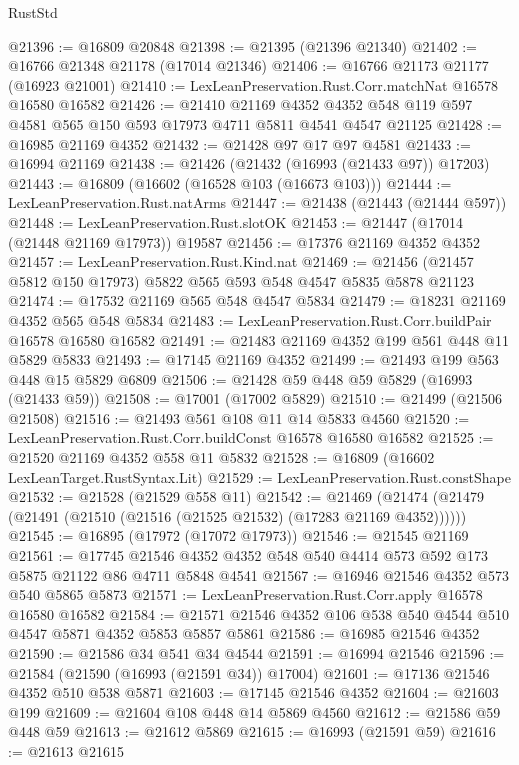 \begin{lexlean}{RustStd}
\begin{coremodule}
@21396 := @16809 @20848
@21398 := @21395 (@21396 @21340)
@21402 := @16766 @21348 @21178 (@17014 @21346)
@21406 := @16766 @21173 @21177 (@16923 @21001)
@21410 := LexLeanPreservation.Rust.Corr.matchNat @16578 @16580 @16582
@21426 := @21410
    @21169
    @4352
    @4352
    @548
    @119
    @597
    @4581
    @565
    @150
    @593
    @17973
    @4711
    @5811
    @4541
    @4547
    @21125
@21428 := @16985 @21169 @4352
@21432 := @21428 @97 @17 @97 @4581
@21433 := @16994 @21169
@21438 := @21426 (@21432 (@16993 (@21433 @97)) @17203)
@21443 := @16809 (@16602 (@16528 @103 (@16673 @103)))
@21444 := LexLeanPreservation.Rust.natArms
@21447 := @21438 (@21443 (@21444 @597))
@21448 := LexLeanPreservation.Rust.slotOK
@21453 := @21447 (@17014 (@21448 @21169 @17973)) @19587
@21456 := @17376 @21169 @4352 @4352
@21457 := LexLeanPreservation.Rust.Kind.nat
@21469 := @21456 (@21457 @5812 @150 @17973) @5822 @565 @593 @548 @4547 @5835 @5878 @21123
@21474 := @17532 @21169 @565 @548 @4547 @5834
@21479 := @18231 @21169 @4352 @565 @548 @5834
@21483 := LexLeanPreservation.Rust.Corr.buildPair @16578 @16580 @16582
@21491 := @21483 @21169 @4352 @199 @561 @448 @11 @5829 @5833
@21493 := @17145 @21169 @4352
@21499 := @21493 @199 @563 @448 @15 @5829 @6809
@21506 := @21428 @59 @448 @59 @5829 (@16993 (@21433 @59))
@21508 := @17001 (@17002 @5829)
@21510 := @21499 (@21506 @21508)
@21516 := @21493 @561 @108 @11 @14 @5833 @4560
@21520 := LexLeanPreservation.Rust.Corr.buildConst @16578 @16580 @16582
@21525 := @21520 @21169 @4352 @558 @11 @5832
@21528 := @16809 (@16602 LexLeanTarget.RustSyntax.Lit)
@21529 := LexLeanPreservation.Rust.constShape
@21532 := @21528 (@21529 @558 @11)
@21542 := @21469 (@21474 (@21479 (@21491 (@21510 (@21516 (@21525 @21532) (@17283 @21169 @4352))))))
@21545 := @16895 (@17972 (@17072 @17973))
@21546 := @21545 @21169
@21561 := @17745
    @21546
    @4352
    @4352
    @548
    @540
    @4414
    @573
    @592
    @173
    @5875
    @21122
    @86
    @4711
    @5848
    @4541
@21567 := @16946 @21546 @4352 @573 @540 @5865 @5873
@21571 := LexLeanPreservation.Rust.Corr.apply @16578 @16580 @16582
@21584 := @21571 @21546 @4352 @106 @538 @540 @4544 @510 @4547 @5871 @4352 @5853 @5857 @5861
@21586 := @16985 @21546 @4352
@21590 := @21586 @34 @541 @34 @4544
@21591 := @16994 @21546
@21596 := @21584 (@21590 (@16993 (@21591 @34)) @17004)
@21601 := @17136 @21546 @4352 @510 @538 @5871
@21603 := @17145 @21546 @4352
@21604 := @21603 @199
@21609 := @21604 @108 @448 @14 @5869 @4560
@21612 := @21586 @59 @448 @59
@21613 := @21612 @5869
@21615 := @16993 (@21591 @59)
@21616 := @21613 @21615

\end{coremodule}
\end{lexlean}
